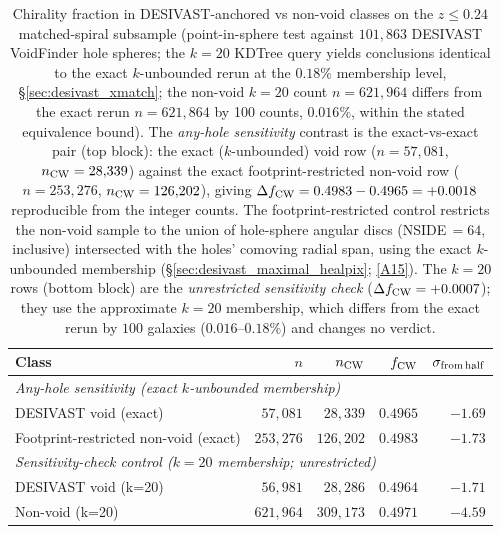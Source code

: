 \documentclass[aps,prd,twocolumn,superscriptaddress,showpacs,preprintnumbers,nofootinbib,longbibliography,floatfix]{revtex4-2}
\newcommand{\repoBase}{https://github.com/Hubify-Projects/bigbounce/blob/main}
\begin{document}
\begin{table}[ht]
\caption{Chirality fraction in DESIVAST-anchored vs non-void classes
on the $z \leq 0.24$ matched-spiral subsample (point-in-sphere test
against $101{,}863$ DESIVAST VoidFinder hole spheres; the $k=20$
KDTree query yields conclusions identical to the exact $k$-unbounded
rerun at the $0.18\%$ membership level, \S\ref{sec:desivast_xmatch};
the non-void $k\!=\!20$ count $n=621{,}964$ differs from the exact
rerun $n=621{,}864$ by 100 counts, $0.016\%$, within the stated
equivalence bound).
The \emph{any-hole sensitivity} contrast is the exact-vs-exact pair (top block): the
exact ($k$-unbounded) void row ($n = 57{,}081$, $n_{\rm CW} = 28{,}339$)
against the exact footprint-restricted non-void row ($n = 253{,}276$,
$n_{\rm CW} = 126{,}202$), giving
$\Delta f_{\rm CW} = 0.4983 - 0.4965 = +0.0018$ reproducible from the
integer counts. The footprint-restricted control restricts the non-void
sample to the union of hole-sphere angular discs (NSIDE\,$=\!64$,
inclusive) intersected with the holes' comoving radial span, using the
exact $k$-unbounded membership
(\S\ref{sec:desivast_maximal_healpix};
\href{\repoBase/pipelines/p5\_desi\_chirality/outputs/29\_ext3\_desivast\_footprint\_retabulation.json}{[A15]}).
The $k=20$ rows (bottom block) are the \emph{unrestricted sensitivity
check} ($\Delta f_{\rm CW} = +0.0007$); they use the approximate $k=20$
membership, which differs from the exact rerun by $100$ galaxies
($0.016$--$0.18\%$) and changes no verdict.}
\label{tab:desivast_canonical}
\begin{ruledtabular}
\begin{tabular}{lrrrr}
Class & $n$ & $n_{\rm CW}$ & $f_{\rm CW}$ & $\sigma_{\rm from\,half}$ \\
\hline
\multicolumn{5}{l}{\textit{Any-hole sensitivity (exact $k$-unbounded membership)}} \\
DESIVAST void (exact) & $57{,}081$ & $28{,}339$ & $0.4965$ & $-1.69$ \\
Footprint-restricted non-void (exact) & $253{,}276$ & $126{,}202$ & $0.4983$ & $-1.73$ \\
\hline
\multicolumn{5}{l}{\textit{Sensitivity-check control ($k=20$ membership; unrestricted)}} \\
DESIVAST void (k=20) & $56{,}981$ & $28{,}286$ & $0.4964$ & $-1.71$ \\
Non-void (k=20)      & $621{,}964$ & $309{,}173$ & $0.4971$ & $-4.59$ \\
\end{tabular}
\end{ruledtabular}
\end{table}
\end{document}
